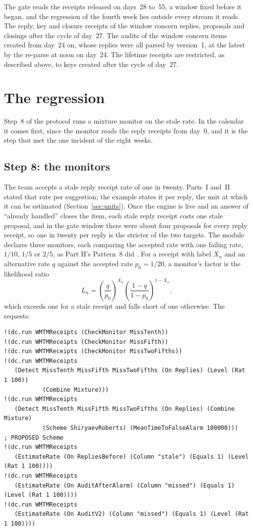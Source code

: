 \documentclass[11pt]{article}
\theoremstyle{definition}
\theoremstyle{plain}
\begin{document}
The gate reads the receipts released on days~28 to~55, a window fixed before it began, and the
regression of the fourth week lies outside every stream it reads. The reply, key and closure
receipts of the window concern replies, proposals and closings after the cycle of day~27. The
audits of the window concern items created from day~24 on, whose replies were all parsed by
version~1, at the latest by the re-parse at noon on day~24. The lifetime receipts are restricted,
as described above, to keys created after the cycle of day~27.
\section{The regression}\label{sec:regression}

Step~8 of the protocol runs a mixture monitor on the stale rate. In the calendar it comes first,
since the monitor reads the reply receipts from day~0, and it is the step that met the one incident
of the eight weeks.

\subsection{Step 8: the monitors}\label{sec:monitors}

The team accepts a stale reply receipt rate of one in twenty. Parts~I and~II stated that rate per
suggestion; the example states it per reply, the unit at which it can be estimated
(Section~\ref{sec:units}). Once the engine is live and an answer of ``already handled'' closes the
item, each stale reply receipt costs one stale proposal, and in the gate window there were about
four proposals for every reply receipt, so one in twenty per reply is the stricter of the two
targets. The module declares three monitors, each comparing the accepted rate with one failing
rate, $1/10$, $1/5$ or $2/5$, as Part II's Pattern~8 did \cite[Section~6.8]{part2}. For a receipt
with label $X_n$ and an alternative rate $q$ against the accepted rate $p_0=1/20$, a monitor's
factor is the likelihood ratio
\[
L_n=\left(\frac{q}{p_0}\right)^{X_n}\left(\frac{1-q}{1-p_0}\right)^{1-X_n},
\]
which exceeds one for a stale receipt and falls short of one otherwise. The requests:

\begin{lstlisting}[style=mettamod]
!(dc.run WMTMReceipts (CheckMonitor MissTenth))
!(dc.run WMTMReceipts (CheckMonitor MissFifth))
!(dc.run WMTMReceipts (CheckMonitor MissTwoFifths))
!(dc.run WMTMReceipts
   (Detect MissTenth MissFifth MissTwoFifths (On Replies) (Level (Rat 1 100))
           (Combine Mixture)))
!(dc.run WMTMReceipts
   (Detect MissTenth MissFifth MissTwoFifths (On Replies) (Combine Mixture)
           (Scheme ShiryaevRoberts) (MeanTimeToFalseAlarm 100000)))   ; PROPOSED Scheme
!(dc.run WMTMReceipts
   (EstimateRate (On RepliesBefore) (Column "stale") (Equals 1) (Level (Rat 1 100))))
!(dc.run WMTMReceipts
   (EstimateRate (On AuditAfterAlarm) (Column "missed") (Equals 1) (Level (Rat 1 100))))
!(dc.run WMTMReceipts
   (EstimateRate (On AuditV2) (Column "missed") (Equals 1) (Level (Rat 1 100))))
\end{lstlisting}
\end{document}

